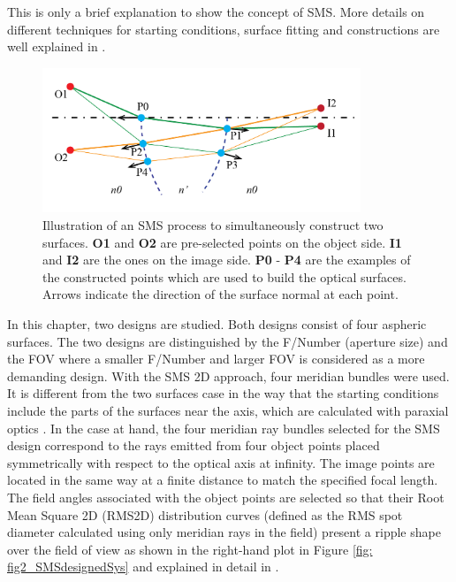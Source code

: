 This is only a brief explanation to show the concept of SMS. More details on different techniques for starting conditions, surface fitting and constructions are well explained in \cite{book:ChavesNonimagingOptics}.

\begin{figure}[h!]
    \centering
    \includegraphics[width=0.85\textwidth]{chapter-5/figures/Figure_sms_explain_2D.png}
    \caption{Illustration of an SMS process to simultaneously construct two surfaces. \textbf{O1} and \textbf{O2} are pre-selected points on the object side. \textbf{I1} and \textbf{I2} are the ones on the image side. \textbf{P0} - \textbf{P4} are the examples of the constructed points which are used to build the optical surfaces. Arrows indicate the direction of the surface normal at each point. }
    \label{fig: sms_2d_explain}
\end{figure}

In this chapter, two designs are studied. Both designs consist of four aspheric surfaces. The two designs are distinguished by the F/Number (aperture size) and the FOV where a smaller F/Number and larger FOV is considered as a more demanding design. With the SMS 2D approach, four meridian bundles were used. It is different from the two surfaces case in the way that the starting conditions include the parts of the surfaces near the axis, which are calculated with paraxial optics \cite{MinanoOE09}. In the case at hand, the four meridian ray bundles selected for the SMS design correspond to the rays emitted from four object points placed symmetrically with respect to the optical axis at infinity. The image points are located in the same way at a finite distance to match the specified focal length. The field angles associated with the object points are selected so that their Root Mean Square 2D (RMS2D) distribution curves (defined as the RMS spot diameter calculated using only meridian rays in the field) present a ripple shape over the field of view as shown in the right-hand plot in Figure \ref{fig: fig2_SMSdesignedSys} and explained in detail in \cite{LinWang12OE}. 

